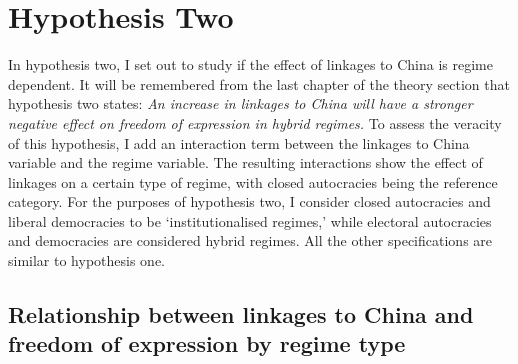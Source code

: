\section{Hypothesis Two} \label{sec:h2}
In hypothesis two, I set out to study if the effect of linkages to China is regime dependent. It will be remembered from the last chapter of the theory section that hypothesis two states: \textit{An increase in linkages to China will have a stronger negative effect on freedom of expression in hybrid regimes.} To assess the veracity of this hypothesis, I add an interaction term between the linkages to China variable and the regime variable. The resulting interactions show the effect of linkages on a certain type of regime, with closed autocracies being the reference category. For the purposes of hypothesis two, I consider closed autocracies and liberal democracies to be `institutionalised regimes,' while electoral autocracies and democracies are considered hybrid regimes. All the other specifications are similar to hypothesis one. 

\subsection{Relationship between linkages to China and freedom of expression by regime type}

